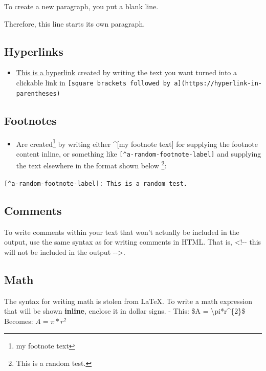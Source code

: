 \documentclass[a4paper,nobind]{templates/ociamthesis}
\providecommand{\tightlist}{%
  \setlength{\itemsep}{0pt}\setlength{\parskip}{0pt}}
\begin{document}
To create a new paragraph, you put a blank line.

Therefore, this line starts its own paragraph.

\subsection{Hyperlinks}\label{hyperlinks}

\begin{itemize}
\tightlist
\item
  \href{https://www.google.com}{This is a hyperlink} created by writing
  the text you want turned into a clickable link in
  \texttt{{[}square\ brackets\ followed\ by\ a{]}(https://hyperlink-in-parentheses)}
\end{itemize}

\subsection{Footnotes}\label{footnotes}

\begin{itemize}
\tightlist
\item
  Are created\footnote{my footnote text} by writing either \^{}{[}my
  footnote text{]} for supplying the footnote content inline, or
  something like \texttt{{[}\^{}a-random-footnote-label{]}} and
  supplying the text elsewhere in the format shown below \footnote{This
    is a random test.}:
\end{itemize}

\texttt{{[}\^{}a-random-footnote-label{]}:\ This\ is\ a\ random\ test.}

\subsection{Comments}\label{comments}

To write comments within your text that won't actually be included in
the output, use the same syntax as for writing comments in HTML. That
is, \textless{}!-\/- this will not be included in the output
-\/-\textgreater{}.

\subsection{Math}\label{math}

The syntax for writing math is stolen from LaTeX. To write a math
expression that will be shown \textbf{inline}, enclose it in dollar
signs. - This: \$A = \textbackslash{}pi*r\^{}\{2\}\$ Becomes:
\(A = \pi*r^{2}\)
\end{document}
